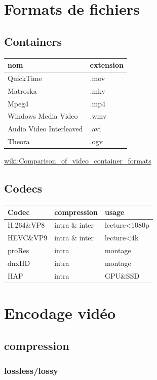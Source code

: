\documentclass[
]{book}
\begin{document}
\hypertarget{formats-de-fichiers}{%
\section{Formats de fichiers}\label{formats-de-fichiers}}

\hypertarget{containers}{%
\subsection{Containers}\label{containers}}

\begin{longtable}[]{@{}ll@{}}
\toprule
nom & extension\tabularnewline
\midrule
\endhead
QuickTime & .mov\tabularnewline
Matroska & .mkv\tabularnewline
Mpeg4 & .mp4\tabularnewline
Windows Media Video & .wmv\tabularnewline
Audio Video Interleaved & .avi\tabularnewline
Theora & .ogv\tabularnewline
\bottomrule
\end{longtable}

\href{https://en.wikipedia.org/wiki/Comparison_of_video_container_formats}{wiki:Comparison\_of\_video\_container\_formats}

\hypertarget{codecs}{%
\subsection{Codecs}\label{codecs}}

\begin{longtable}[]{@{}lll@{}}
\toprule
Codec & compression & usage\tabularnewline
\midrule
\endhead
H.264\&VP8 & intra \& inter & lecture\textless1080p\tabularnewline
HEVC\&VP9 & intra \& inter & lecture\textless4k\tabularnewline
proRes & intra & montage\tabularnewline
dnxHD & intra & montage\tabularnewline
HAP & intra & GPU\&SSD\tabularnewline
\bottomrule
\end{longtable}

\hypertarget{encodage-viduxe9o}{%
\section{Encodage vidéo}\label{encodage-viduxe9o}}

\hypertarget{compression}{%
\subsection{compression}\label{compression}}

\hypertarget{losslesslossy}{%
\subsubsection{lossless/lossy}\label{losslesslossy}}
\end{document}
